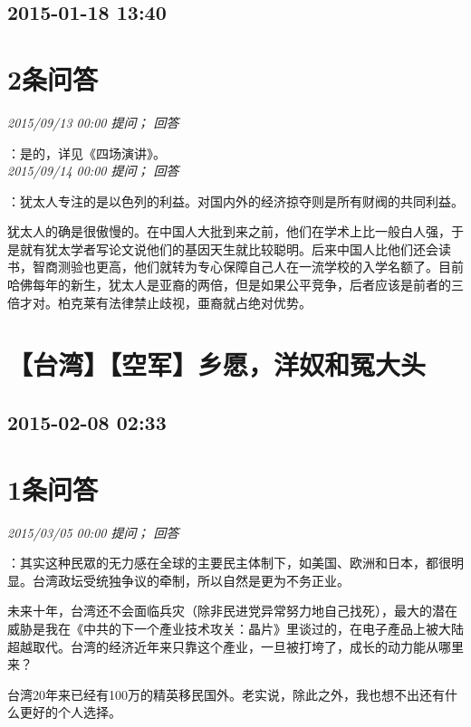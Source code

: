 \documentclass[twocolumn]{ctexart}
\begin{document}
\subsection{2015-01-18 13:40}


\section{2条问答}

\textit{\hfill\noindent\small 2015/09/13 00:00 提问； 回答}

：是的，详见《四场演讲》。\\

\textit{\hfill\noindent\small 2015/09/14 00:00 提问； 回答}

：犹太人专注的是以色列的利益。对国内外的经济掠夺则是所有财阀的共同利益。

犹太人的确是很傲慢的。在中国人大批到来之前，他们在学术上比一般白人强，于是就有犹太学者写论文说他们的基因天生就比较聪明。后来中国人比他们还会读书，智商测验也更高，他们就转为专心保障自己人在一流学校的入学名额了。目前哈佛每年的新生，犹太人是亚裔的两倍，但是如果公平竞争，后者应该是前者的三倍才对。柏克莱有法律禁止歧视，亜裔就占绝对优势。\\


\section{【台湾】【空军】乡愿，洋奴和冤大头}
\subsection{2015-02-08 02:33}


\section{1条问答}

\textit{\hfill\noindent\small 2015/03/05 00:00 提问； 回答}

：其实这种民眾的无力感在全球的主要民主体制下，如美国、欧洲和日本，都很明显。台湾政坛受统独争议的牵制，所以自然是更为不务正业。

未来十年，台湾还不会面临兵灾（除非民进党异常努力地自己找死），最大的潜在威胁是我在《中共的下一个產业技术攻关：晶片》里谈过的，在电子產品上被大陆超越取代。台湾的经济近年来只靠这个產业，一旦被打垮了，成长的动力能从哪里来？

台湾20年来已经有100万的精英移民国外。老实说，除此之外，我也想不出还有什么更好的个人选择。\\
\end{document}
